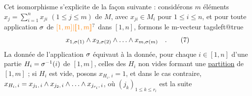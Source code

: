 Cet isomorphisme s'explicite de la façon suivante : considérons $m$ éléments $x_j=\sum_{i=1}^{n}x_{ji}$ $(1\leq j\leq m)$ de $M$, avec $x_{ji}\in M_i$ pour $1\leq i\leq n$, et pour toute application $\sigma$ de $\unsure{[1,m]|[\![1,m]\!]}$ dans $[1,n]$, formons le m-vecteur
\begingroup\csname tagsleft@true\endcsname
\[
 x_{1,\sigma(1)}\wedge x_{2,\sigma(2)}\wedge\ldots\wedge x_{m,\sigma(m)}\quad .\tag*{(7)}
\]
\endgroup
La donnée de l'application $\sigma$ équivaut à la donnée, pour chaque $i\in[1,n]$ d'une partie $H_i=\sigma^{-1}(i)$ de $[1,m]$, celles des $H_i$ non vides formant une \uline{partition} de $[1,m]$ ; si $H_i$ est vide, posons $x_{H_i,\,i}=1$, et dans le cas contraire, $x_{H_i,\,i}=x_{j_1,\,i}\wedge x_{j_2,\,i}\wedge\ldots\wedge x_{j_{r_i},\,i}$, où $(j_k)_{1\leq k\leq r_i}$ est la suite


